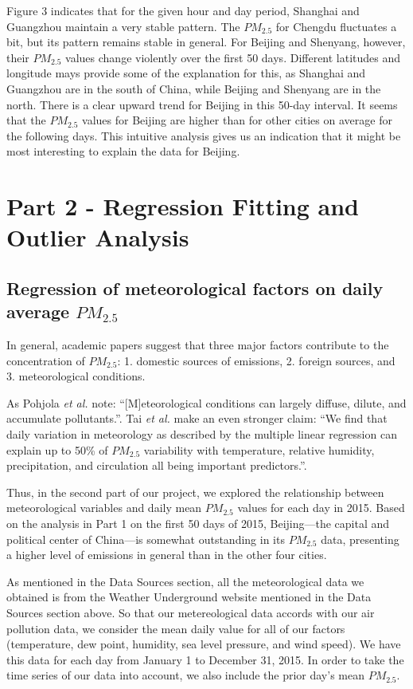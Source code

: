 \documentclass[11pt]{article} %
\begin{document}
Figure 3 indicates that for the given hour and day period, Shanghai and Guangzhou maintain a very stable pattern. The \(PM_{2.5}\) for Chengdu fluctuates a bit, but its pattern remains stable in general. For Beijing and Shenyang, however, their  \(PM_{2.5}\) values change violently over the first 50 days. Different latitudes and longitude mays provide some of the explanation for this, as Shanghai and Guangzhou are in the south of China, while Beijing and Shenyang are in the north. 
	There is a clear upward trend for Beijing in this 50-day interval. It seems that the \(PM_{2.5}\) values for Beijing are higher than for other cities on average for the following days. This intuitive analysis gives us an indication that it might be most interesting to explain the data for Beijing.

\newpage

\section{Part 2 - Regression Fitting and Outlier Analysis}
\subsection{Regression of meteorological factors on daily average \(PM_{2.5}\)}

In general, academic papers\cite{Chatani11, Tai10, Pohjola02} suggest that three major factors contribute to the concentration of \(PM_{2.5}\): 1. domestic sources of emissions, 2. foreign sources, and 3. meteorological conditions.

As Pohjola \textit{et al.} note: “[M]eteorological conditions can largely diffuse, dilute, and accumulate pollutants.”\cite{Pohjola02}. Tai \textit{et al.} make an even stronger claim: “We find that daily variation in meteorology as described by the multiple linear regression can explain up to 50\% of \(PM_{2.5}\) variability with temperature, relative humidity, precipitation, and circulation all being important predictors.”\cite{Tai10}.
 
Thus, in the second part of our project, we explored the relationship between meteorological variables and daily mean \(PM_{2.5}\) values for each day in 2015. 
Based on the analysis in Part 1 on the first 50 days of 2015, Beijing---the capital and political center of China---is somewhat outstanding in its \(PM_{2.5}\) data, presenting a higher level of emissions in general than in the other four cities.

As mentioned in the Data Sources section, all the meteorological data we obtained is from the Weather Underground website mentioned in the Data Sources section above. So that our metereological data accords with our air pollution data, we consider the mean daily value for all of our factors (temperature, dew point, humidity, sea level pressure, and wind speed). We have this data for each day from January 1 to December 31, 2015. In order to take the time series of our data into account, we also include the prior day's mean \(PM_{2.5}\).
\end{document}

